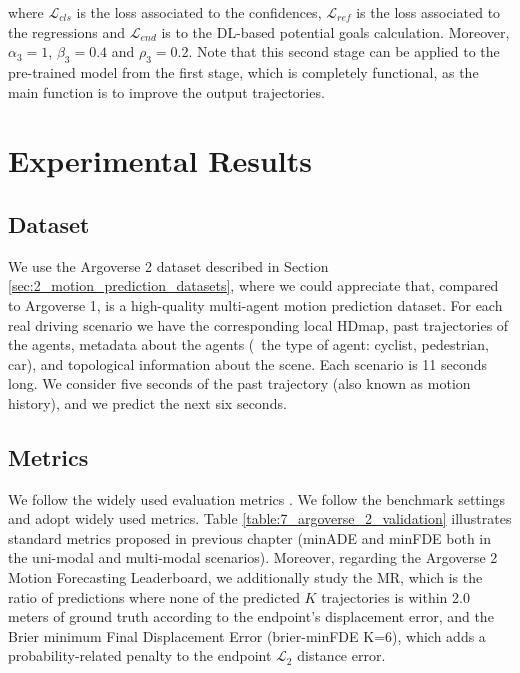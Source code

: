 where $\mathcal{L}_{cls}$ is the loss associated to the confidences, $\mathcal{L}_{ref}$ is the loss associated to the regressions and $\mathcal{L}_{end}$ is to the \ac{DL}-based potential goals calculation. Moreover, $\alpha_3=1$, $\beta_3=0.4$ and $\rho_3=0.2$. Note that this second stage can be applied to the pre-trained model from the first stage, which is completely functional, as the main function is to improve the output trajectories.

\section{Experimental Results}
\label{sec:7_experimental_results}

\subsection{Dataset}
\label{subsec:7_experimental_results_dataset}

We use the Argoverse 2 \cite{wilson2023argoverse} dataset described in Section \ref{sec:2_motion_prediction_datasets}, where we could appreciate that, compared to Argoverse 1, is a high-quality multi-agent motion prediction dataset. For each real driving scenario we have the corresponding local \ac{HDmap}, past trajectories of the agents, metadata about the agents (\eg \ the type of agent: cyclist, pedestrian, car), and topological information about the scene. Each scenario is 11 seconds long. We consider five seconds of the past trajectory (also known as motion history), and we predict the next six seconds. 

\subsection{Metrics}
\label{subsec:7_experimental_results_metrics}

We follow the widely used evaluation metrics \cite{zeng2021lanercnn,gu2021densetnt,ye2021tpcn}. We follow the benchmark settings and adopt widely used metrics. Table \ref{table:7_argoverse_2_validation} illustrates standard metrics proposed in previous chapter (\ac{minADE} and \ac{minFDE} both in the uni-modal and multi-modal scenarios). Moreover, regarding the Argoverse 2 Motion Forecasting Leaderboard, we additionally study the MR, which is the ratio of predictions where none of the predicted $K$ trajectories is within 2.0 meters of ground truth according to the endpoint's displacement error, and the Brier minimum Final Displacement Error (brier-\ac{minFDE} K=6), which adds a probability-related penalty to the endpoint $\mathcal{L}_2$ distance error. 


